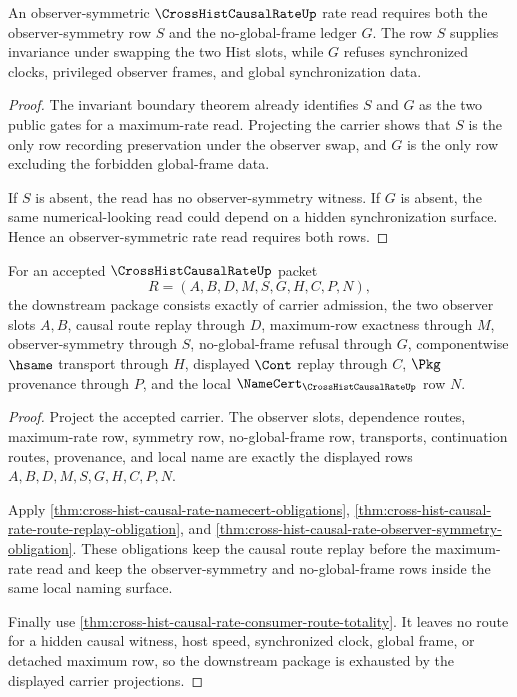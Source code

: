 \begin{theorem}
\label{thm:cross-hist-causal-rate-observer-symmetry-obligation}
An observer-symmetric $\CrossHistCausalRateUp$ rate read requires both the observer-symmetry row $S$ and the no-global-frame ledger $G$. The row $S$ supplies invariance under swapping the two Hist slots, while $G$ refuses synchronized clocks, privileged observer frames, and global synchronization data.
\end{theorem}
\begin{proof}
The invariant boundary theorem already identifies $S$ and $G$ as the two public gates for a maximum-rate read. Projecting the carrier shows that $S$ is the only row recording preservation under the observer swap, and $G$ is the only row excluding the forbidden global-frame data.

If $S$ is absent, the read has no observer-symmetry witness. If $G$ is absent, the same numerical-looking read could depend on a hidden synchronization surface. Hence an observer-symmetric rate read requires both rows.
\end{proof}

\begin{theorem}
\label{thm:cross-hist-causal-rate-downstream-unblock-package}
For an accepted $\CrossHistCausalRateUp$ packet
$$
R=(A,B,D,M,S,G,H,C,P,N),
$$
the downstream package consists exactly of carrier admission, the two observer slots $A,B$, causal route replay through $D$, maximum-row exactness through $M$, observer-symmetry through $S$, no-global-frame refusal through $G$, componentwise $\hsame$ transport through $H$, displayed $\Cont$ replay through $C$, $\Pkg$ provenance through $P$, and the local $\NameCert_{\CrossHistCausalRateUp}$ row $N$.
\end{theorem}
\begin{proof}
Project the accepted carrier. The observer slots, dependence routes, maximum-rate row, symmetry row, no-global-frame row, transports, continuation routes, provenance, and local name are exactly the displayed rows $A,B,D,M,S,G,H,C,P,N$.

Apply \autoref{thm:cross-hist-causal-rate-namecert-obligations}, \autoref{thm:cross-hist-causal-rate-route-replay-obligation}, and \autoref{thm:cross-hist-causal-rate-observer-symmetry-obligation}. These obligations keep the causal route replay before the maximum-rate read and keep the observer-symmetry and no-global-frame rows inside the same local naming surface.

Finally use \autoref{thm:cross-hist-causal-rate-consumer-route-totality}. It leaves no route for a hidden causal witness, host speed, synchronized clock, global frame, or detached maximum row, so the downstream package is exhausted by the displayed carrier projections.
\end{proof}


